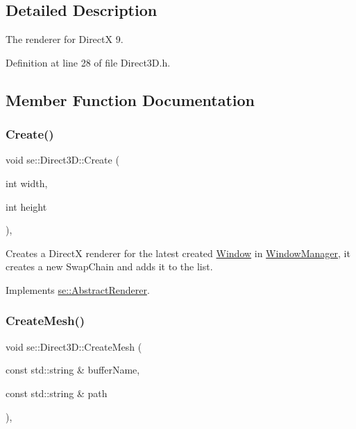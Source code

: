 \subsection{Detailed Description}
The renderer for DirectX 9. 

Definition at line 28 of file Direct3\+D.\+h.



\subsection{Member Function Documentation}
\mbox{\label{classse_1_1_direct3_d_af88b0fb33fe5bff1112213e6c8faf466}} 
\subsubsection{\texorpdfstring{Create()}{Create()}}
{\footnotesize\ttfamily void se\+::\+Direct3\+D\+::\+Create (\begin{DoxyParamCaption}\item[{int}]{width,  }\item[{int}]{height }\end{DoxyParamCaption})\hspace{0.3cm}{\ttfamily [override]}, {\ttfamily [virtual]}}

Creates a DirectX renderer for the latest created \mbox{\hyperlink{classse_1_1_window}{Window}} in \mbox{\hyperlink{classse_1_1_window_manager}{Window\+Manager}}, it creates a new Swap\+Chain and adds it to the list. 

Implements \mbox{\hyperlink{classse_1_1_abstract_renderer_a3b0c7d8dc34c56513b3160e2cf1e094a}{se\+::\+Abstract\+Renderer}}.

\mbox{\label{classse_1_1_direct3_d_aab3d1a8b4ee8812dea07f5ecda5efc42}} 
\subsubsection{\texorpdfstring{Create\+Mesh()}{CreateMesh()}}
{\footnotesize\ttfamily void se\+::\+Direct3\+D\+::\+Create\+Mesh (\begin{DoxyParamCaption}\item[{const std\+::string \&}]{buffer\+Name,  }\item[{const std\+::string \&}]{path }\end{DoxyParamCaption})\hspace{0.3cm}{\ttfamily [override]}, {\ttfamily [virtual]}}

